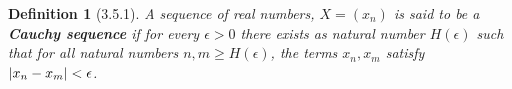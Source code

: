 \documentclass{article}
\newtheorem*{definition}{Definition}
\DeclarePairedDelimiter\abs{\lvert}{\rvert}%
\begin{document}
\begin{definition}[3.5.1] A sequence of real numbers, $X=(x_n)$ is said to be a \textbf{Cauchy sequence}
  if for every $\epsilon>0$ there exists as natural number $H(\epsilon)$ such that for all natural
  numbers $n,m\ge{H(\epsilon)}$, the terms $x_n,x_m$ satisfy $\abs{x_n-x_m}<\epsilon$.
\end{definition}
\end{document}
